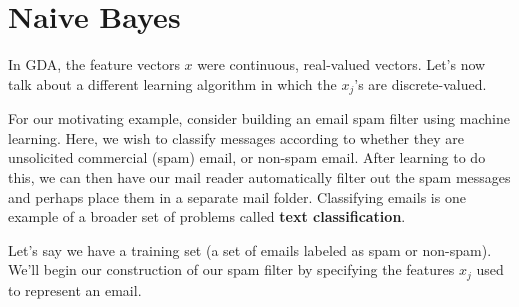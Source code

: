 \documentclass{article}
\begin{document}


\section{Naive Bayes}

In GDA, the feature vectors $x$ were continuous, real-valued vectors.  Let's now talk
about a different learning algorithm in which the $x_j$'s are discrete-valued.

For our motivating example, consider building an email spam filter using machine
learning.  Here, we wish to classify messages according to whether they are
unsolicited commercial (spam) email, or non-spam email.  After learning to do this,
we can then have our mail reader automatically filter out the spam messages and perhaps
place them in a separate mail folder.  Classifying emails is one example of a broader
set of problems called {\bf text classification}.

Let's say we have a training set (a set of emails labeled as spam or non-spam).
We'll begin our construction of our spam filter by specifying the features $x_j$ used
to represent an email.
\end{document}
